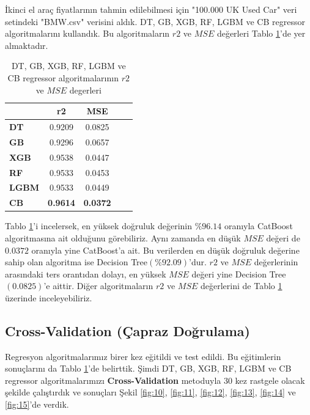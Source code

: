 \documentclass[conference]{IEEEtran}
\begin{document}
\quad İkinci el araç fiyatlarının tahmin edilebilmesi için "100.000 UK Used Car" \cite{3} veri setindeki "BMW.csv" verisini aldık. DT, GB, XGB, RF, LGBM ve CB regressor algoritmalarını kullandık. Bu algoritmaların $r2$ ve $MSE$ değerleri Tablo \ref{tbl:01}'de yer almaktadır.

\begin{table}[h]
	\centering
	\normalsize
	\begin{tabular}{|l|c|c|c|c|}
		\hline
					& \textbf{r2}	& \textbf{MSE}	\\ \hline
		\textbf{DT}		& 0.9209		& 0.0825		\\ \hline
		\textbf{GB}		& 0.9296		& 0.0657		\\ \hline
		\textbf{XGB}		& 0.9538		& 0.0447		\\ \hline
		\textbf{RF}		& 0.9533		& 0.0453		\\ \hline
		\textbf{LGBM}	& 0.9533		& 0.0449		\\ \hline
		\textbf{CB}		& \textbf{0.9614}	& \textbf{0.0372}	\\ \hline
	\end{tabular}
	\caption{DT, GB, XGB, RF, LGBM ve CB regressor algoritmalarının $r2$ ve $MSE$ degerleri}
	\label{tbl:01}
\end{table}

\quad Tablo \ref{tbl:01}'i incelersek, en yüksek doğruluk değerinin $\%96.14$ oranıyla CatBoost algoritmasına ait olduğunu görebiliriz. Aynı zamanda en düşük $MSE$ değeri de $0.0372$ oranıyla yine CatBoost'a ait. Bu verilerden en düşük doğruluk değerine sahip olan algoritma ise Decision Tree$(\%92.09)$'dur. $r2$ ve $MSE$ değerlerinin arasındaki ters orantıdan dolayı, en yüksek $MSE$ değeri yine Decision Tree$(0.0825)$'e aittir. Diğer algoritmaların $r2$ ve $MSE$ değerlerini de Tablo \ref{tbl:01} üzerinde inceleyebiliriz.


\subsection{\textbf{Cross-Validation (Çapraz Doğrulama)}}
\quad Regresyon algoritmalarımız birer kez eğitildi ve test edildi. Bu eğitimlerin sonuçlarını da Tablo \ref{tbl:01}'de belirttik. Şimdi  DT, GB, XGB, RF, LGBM ve CB regressor algoritmalarımızı \textbf{Cross-Validation} metoduyla 30 kez rastgele olacak şekilde çalıştırdık ve sonuçları Şekil \ref{fig:10}, \ref{fig:11}, \ref{fig:12}, \ref{fig:13}, \ref{fig:14} ve \ref{fig:15}'de verdik.
\end{document}
